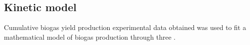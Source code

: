 \subsection{Kinetic model}
Cumulative biogas yield production experimental data obtained was used to fit a mathematical model of biogas production through three .